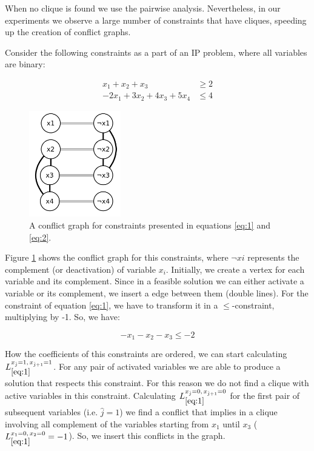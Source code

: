 \documentclass{endm}
\begin{document}
When no clique is found we use the pairwise analysis. Nevertheless, in our experiments we observe a large number of constraints that have cliques, speeding up the creation of conflict graphs.

\begin{example}

Consider the following constraints as a part of an IP problem, where all variables are binary:

\begin{align}
x_1 + x_2 + x_3  & \geq 2\label{eq:1}\\
- 2x_1 + 3x_2 + 4x_3 + 5x_4 & \leq 4\label{eq:2}
\end{align}

\begin{figure}[!ht]
  \begin{center}
    \includegraphics[width=4cm]{graph.png}
  \end{center}
  \caption{A conflict graph for constraints presented in equations \ref{eq:1} and \ref{eq:2}.}
  \label{graph}
\end{figure}

Figure \ref{graph} shows the conflict graph for this constraints, where $\neg xi$ represents the complement (or deactivation) of variable $x_i$. Initially, we create a vertex for each variable and its complement. Since in a feasible solution we can either activate a variable or its complement, we insert a edge between them (double lines). For the constraint of equation \ref{eq:1}, we have to transform it in a $\leq$-constraint, multiplying by -1. So, we have:

\begin{equation}
- x_1 - x_2 - x_3 \leq - 2
\end{equation}

How the coefficients of this constraints are ordered, we can start calculating $L_{\ref{eq:1}}^{x_{\hat{j}}=1,\, x_{\hat{j}+1}=1}$. For any pair of activated variables we are able to produce a solution that respects this constraint. For this reason we do not find a clique with active variables in this constraint. Calculating $L_{\ref{eq:1}}^{x_{\hat{j}}=0,\, x_{\hat{j}+1}=0}$ for the first pair of subsequent variables (i.e. $\hat{j}=1$) we find a conflict that implies in a clique involving all complement of the variables starting from $x_1$ until $x_3$ ($L_{\ref{eq:1}}^{x_1=0,\, x_2=0} = -1$). So, we insert this conflicts in the graph.


\end{example}
\end{document}
